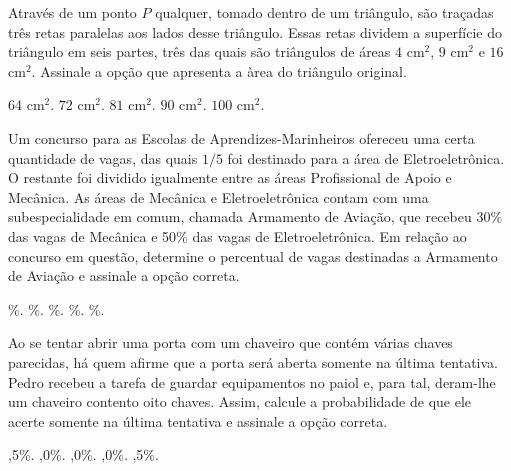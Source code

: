 \begin{question}%
Através de um ponto \(P\) qualquer, tomado dentro de um triângulo, são traçadas três retas paralelas aos lados desse triângulo. Essas retas dividem a superfície do triângulo em seis partes, três das quais são triângulos de áreas \(4\) cm\(^2\), \(9\) cm\(^2\) e \(16\) cm\(^2\). Assinale a opção que apresenta a àrea do triângulo original.
    \begin{tasks}
        \task \(64\) cm\(^2\).
        \task \(72\) cm\(^2\).
        \task \(81\) cm\(^2\).
        \task \(90\) cm\(^2\).
        \task \(100\) cm\(^2\).
    \end{tasks}
\end{question}

\begin{question}%
Um concurso para as Escolas de Aprendizes-Marinheiros ofereceu uma certa quantidade de vagas, das quais \(1/5\) foi destinado para a área de Eletroeletrônica. O restante foi dividido igualmente entre as áreas Profissional de Apoio e Mecânica. As áreas de Mecânica e Eletroeletrônica contam com uma subespecialidade em comum, chamada Armamento de Aviação, que recebeu 30\% das vagas de Mecânica e 50\% das vagas de Eletroeletrônica. Em relação ao concurso em questão, determine o percentual de vagas destinadas a Armamento de Aviação e assinale a opção correta.
    \begin{tasks}
        \%.
        \%.
        \%.
        \%.
        \%.
    \end{tasks}
\end{question}

\begin{question}%
Ao se tentar abrir uma porta com um chaveiro que contém várias chaves parecidas, há quem afirme que a porta será aberta somente na última tentativa. Pedro recebeu a tarefa de guardar equipamentos no paiol e, para tal, deram-lhe um chaveiro contento oito chaves. Assim, calcule a probabilidade de que ele acerte somente na última tentativa e assinale a opção correta.
    \begin{tasks}
        ,5\%.
        ,0\%.
        ,0\%.
        ,0\%.
        ,5\%.
    \end{tasks}
\end{question}